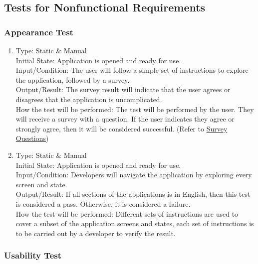 \documentclass[12pt, titlepage]{article}
\begin{document}
\subsection{Tests for Nonfunctional Requirements}
\label{NF-T}
\subsubsection{Appearance Test}

\begin{adjustwidth}{2.2em}{0pt}
\begin{enumerate}[{NF-AT}1.]
    
    \item Type: Static \& Manual \\ \label{AT1}
    Initial State: Application is opened and ready for use.\\
    Input/Condition: The user will follow a simple set of instructions to explore the application, followed by a survey.\\
    Output/Result: The survey result will indicate that the user agrees or disagrees that the application is uncomplicated. \\
    How the test will be performed: The test will be performed by the user. They will receive a survey with a question. If the user indicates they agree or strongly agree, then it will be considered successful. (Refer to \hyperref[SQ]{Survey Questions})
    
    \item Type: Static \& Manual\\ \label{AT2}
    Initial State: Application is opened and ready for use.\\
    Input/Condition: Developers will navigate the application by exploring every screen and state.\\
    Output/Result: If all sections of the applications is in English, then this test is considered a pass. Otherwise, it is considered a failure.\\
    How the test will be performed: Different sets of instructions are used to cover a subset of the application screens and states, each set of instructions is to be carried out by a developer to verify the result. 
  \end{enumerate}
\end{adjustwidth}

\subsubsection{Usability Test}
\end{document}
